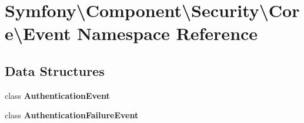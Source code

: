 \section{Symfony\textbackslash{}Component\textbackslash{}Security\textbackslash{}Core\textbackslash{}Event Namespace Reference}
\label{namespace_symfony_1_1_component_1_1_security_1_1_core_1_1_event}
\subsection*{Data Structures}
\begin{DoxyCompactItemize}
\item 
class {\bf Authentication\+Event}
\item 
class {\bf Authentication\+Failure\+Event}
\end{DoxyCompactItemize}
